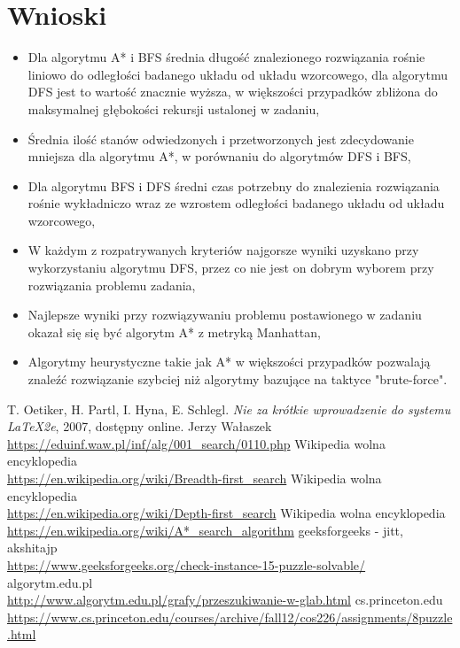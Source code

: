 \documentclass{classrep}
\begin{document}
\section{Wnioski}
{\color{black}
\begin{itemize}
  \item Dla algorytmu A* i BFS średnia długość znalezionego rozwiązania rośnie liniowo do odległości badanego układu od układu wzorcowego, dla algorytmu DFS jest to wartość znacznie wyższa, w większości przypadków zbliżona do maksymalnej głębokości rekursji ustalonej w zadaniu,
  \item Średnia ilość stanów odwiedzonych i przetworzonych jest zdecydowanie mniejsza dla algorytmu A*, w porównaniu do algorytmów DFS i BFS,
  \item Dla algorytmu BFS i DFS średni czas potrzebny do znalezienia rozwiązania rośnie wykładniczo wraz ze wzrostem odległości badanego układu od układu wzorcowego,
  \item W każdym z rozpatrywanych kryteriów najgorsze wyniki uzyskano przy wykorzystaniu algorytmu DFS, przez co nie jest on dobrym wyborem przy rozwiązania problemu zadania,
  \item Najlepsze wyniki przy rozwiązywaniu problemu postawionego w zadaniu okazał się się być algorytm A* z metryką Manhattan,
  \item Algorytmy heurystyczne takie jak A* w większości przypadków pozwalają znaleźć rozwiązanie szybciej niż algorytmy bazujące na taktyce "brute-force". \newline
\end{itemize}}

\begin{thebibliography}{0}
   T. Oetiker, H. Partl, I. Hyna, E. Schlegl.
    \textsl{Nie za krótkie wprowadzenie do systemu \LaTeX2e}, 2007, dostępny
    online.
   Jerzy Wałaszek\\
    \url{https://eduinf.waw.pl/inf/alg/001_search/0110.php}
   Wikipedia wolna encyklopedia\\
    \url{https://en.wikipedia.org/wiki/Breadth-first_search}
   Wikipedia wolna encyklopedia\\
    \url{https://en.wikipedia.org/wiki/Depth-first_search}
   Wikipedia wolna encyklopedia\\
    \url{https://en.wikipedia.org/wiki/A*_search_algorithm}
   geeksforgeeks - jitt, akshitajp\\
    \url{https://www.geeksforgeeks.org/check-instance-15-puzzle-solvable/}
   algorytm.edu.pl\\
    \url{http://www.algorytm.edu.pl/grafy/przeszukiwanie-w-glab.html}
   cs.princeton.edu\\
    \url{https://www.cs.princeton.edu/courses/archive/fall12/cos226/assignments/8puzzle.html}
\end{thebibliography}
\end{document}
